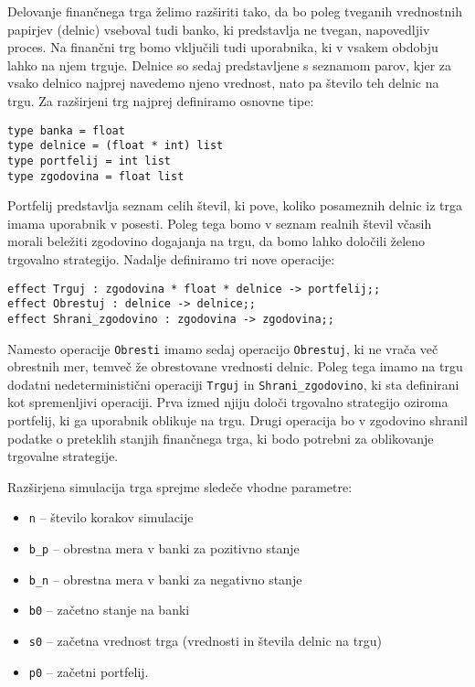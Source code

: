 \documentclass[a4paper,12pt]{article}
\theoremstyle{definition} %
\begin{document}
Delovanje finančnega trga želimo razširiti tako, da bo poleg tveganih vrednostnih papirjev (delnic) vseboval tudi banko, ki predstavlja ne tvegan, napovedljiv proces. Na finančni trg bomo vključili tudi uporabnika, ki v vsakem obdobju lahko na njem trguje. 
Delnice so sedaj predstavljene s seznamom parov, kjer za vsako delnico najprej navedemo njeno vrednost, nato pa število teh delnic na trgu. Za razširjeni trg najprej definiramo osnovne tipe:
\begin{lstlisting}
type banka = float
type delnice = (float * int) list
type portfelij = int list
type zgodovina = float list
\end{lstlisting}
Portfelij predstavlja seznam celih števil, ki pove, koliko posameznih delnic iz trga imama uporabnik v posesti. Poleg tega bomo v seznam realnih števil včasih morali beležiti zgodovino dogajanja na trgu, da bomo lahko določili želeno trgovalno strategijo. Nadalje definiramo tri nove operacije:
\begin{lstlisting}
effect Trguj : zgodovina * float * delnice -> portfelij;;
effect Obrestuj : delnice -> delnice;;
effect Shrani_zgodovino : zgodovina -> zgodovina;;
\end{lstlisting}
Namesto operacije \lstinline{Obresti} imamo  sedaj operacijo \lstinline{Obrestuj}, ki ne vrača več obrestnih mer, temveč že obrestovane vrednosti delnic. Poleg tega imamo na trgu dodatni nedeterministični operaciji \lstinline{Trguj} in \lstinline{Shrani_zgodovino}, ki sta definirani kot spremenljivi operaciji. Prva izmed njiju določi trgovalno strategijo oziroma portfelij, ki ga uporabnik oblikuje na trgu. Drugi operacija bo v zgodovino shranil podatke o preteklih stanjih finančnega trga, ki bodo potrebni za oblikovanje trgovalne strategije. 

Razširjena simulacija trga sprejme sledeče vhodne parametre:
\begin{itemize}
\item \lstinline{n} -- število korakov simulacije
\item \lstinline{b_p}  -- obrestna mera v banki za pozitivno stanje
\item \lstinline{b_n} -- obrestna mera v banki za negativno stanje
\item \lstinline{b0}  -- začetno stanje na banki
\item \lstinline{s0} --  začetna vrednost trga (vrednosti in števila delnic na trgu)
\item \lstinline{p0}  -- začetni portfelij.
\end{itemize}
\end{document}
